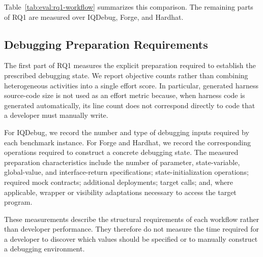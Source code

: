 \documentclass[11pt,oneside]{report}
\theoremstyle{plain}
\theoremstyle{definition}
\theoremstyle{remark}
\begin{document}
Table~\ref{tab:eval:rq1-workflow} summarizes this comparison. The remaining parts of RQ1 are measured over IQDebug, Forge, and Hardhat.

\subsection{Debugging Preparation Requirements}
\label{subsec:eval:rq1:preparation}

The first part of RQ1 measures the explicit preparation required to establish the prescribed debugging state. We report objective counts rather than combining heterogeneous activities into a single effort score. In particular, generated harness source-code size is not used as an effort metric because, when harness code is generated automatically, its line count does not correspond directly to code that a developer must manually write.

For IQDebug, we record the number and type of debugging inputs required by each benchmark instance. For Forge and Hardhat, we record the corresponding operations required to construct a concrete debugging state. The measured preparation characteristics include the number of parameter, state-variable, global-value, and interface-return specifications; state-initialization operations; required mock contracts; additional deployments; target calls; and, where applicable, wrapper or visibility adaptations necessary to access the target program.

These measurements describe the structural requirements of each workflow rather than developer performance. They therefore do not measure the time required for a developer to discover which values should be specified or to manually construct a debugging environment.
\end{document}

